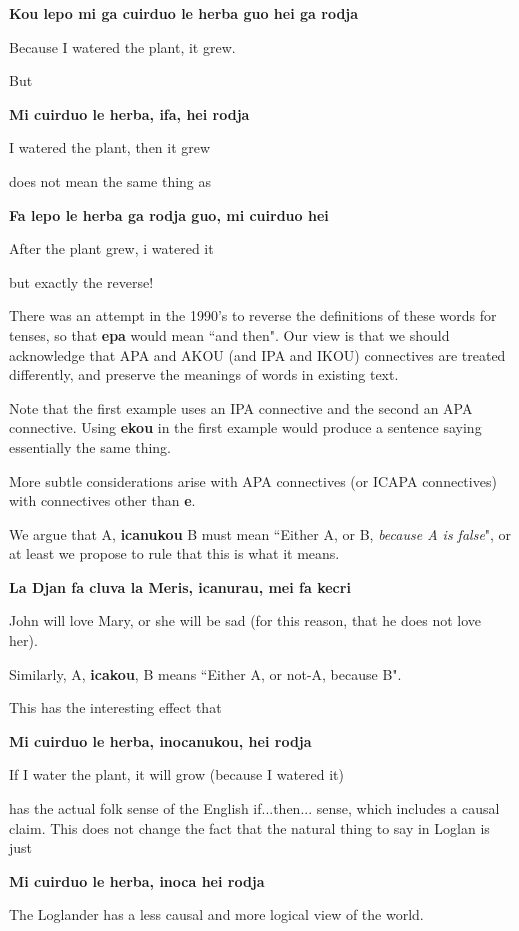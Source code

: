 \documentclass[12pt]{book}
\begin{document}
{{\bf Kou lepo mi ga cuirduo le herba guo hei ga rodja}

Because I watered the plant, it grew.

But

{\bf Mi cuirduo le herba, ifa, hei rodja}

I watered the plant, then it grew

does not mean the same thing as

{\bf Fa lepo le herba ga rodja guo, mi cuirduo hei}

After the plant grew, i watered it

but exactly the reverse!

There was an attempt in the 1990's to reverse the definitions of these words for tenses, so that {\bf epa} would mean ``and then".  Our view is that we should acknowledge that APA and AKOU (and IPA and IKOU) connectives are treated differently, and preserve the meanings of words in existing text.

Note that the first example uses an IPA connective and the second an APA connective.  Using {\bf ekou} in the first example would produce a sentence
saying essentially the same thing.  

More subtle considerations arise with APA connectives (or ICAPA connectives) with connectives other than {\bf e}.

We argue that A, {\bf icanukou} B must mean ``Either A, or B, {\em because A is false}", or at least we propose to rule that this is what it means.

{\bf La Djan fa cluva la Meris, icanurau, mei fa kecri}

John will love Mary, or she will be sad (for this reason, that he does not love her).

Similarly, A, {\bf icakou}, B means ``Either A,  or not-A, because B".

This has the interesting effect that

{\bf Mi cuirduo le herba, inocanukou, hei rodja}

If I water the plant, it will grow (because I watered it)

has the actual folk sense of the English if...then... sense, which includes a causal claim.  This does not change the fact that the natural thing to say
in Loglan is just

{\bf Mi cuirduo le herba, inoca hei rodja}

The Loglander has a less causal and more logical view of the world.

}
\end{document}
